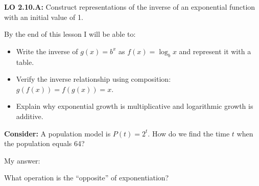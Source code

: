 \documentclass[10pt]{article}
\begin{document}
\namedateperiod

\vspace{0.1in}

\begin{objectivebox}
\textbf{LO 2.10.A:} Construct representations of the inverse of an exponential function with
an initial value of 1.

By the end of this lesson I will be able to:
\begin{itemize}[leftmargin=1.5em,itemsep=3pt,topsep=3pt]
  \item Write the inverse of $g(x)=b^x$ as $f(x)=\log_b x$ and represent it with a table.
  \item Verify the inverse relationship using composition: $g(f(x)) = f(g(x)) = x$.
  \item Explain why exponential growth is multiplicative and logarithmic growth is additive.
\end{itemize}
\end{objectivebox}

\vspace{0.08in}

\begin{vocabbox}
\end{vocabbox}

\vspace{0.08in}

\begin{hookbox}
\textbf{Consider:} A population model is $P(t) = 2^t$. How do we find the time $t$ when the
population equals 64?

\vspace{4pt}
My answer: \writeline

\vspace{4pt}
What operation is the ``opposite'' of exponentiation? \writeline
\end{hookbox}

\vspace{0.08in}
\end{document}
